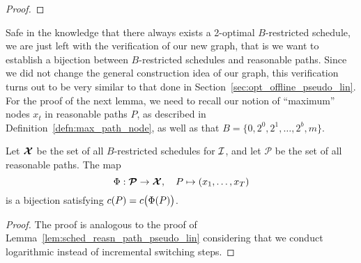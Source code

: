 \begin{proof}
\end{proof}
Safe in the knowledge that there always exists a 2-optimal $B$-restricted schedule, we are just left with the verification of our new graph, that is we want to establish a bijection between $B$-restricted schedules and reasonable paths. Since we did not change the general construction idea of our graph, this verification turns out to be very similar to that done in Section~\ref{sec:opt_offline_pseudo_lin}. For the proof of the next lemma, we need to recall our notion of ``maximum'' nodes $x_t$ in reasonable paths $P$, as described in Definition~\ref{defn:max_path_node}, as well as that $B=\{0,2^0,2^1,\dotsc,2^b,m\}$. 
\begin{lem}\label{lem:sched_reasn_path_approx_2}
Let $\bm{\mathcal{X}}$ be the set of all $B$-restricted schedules for $\mathcal{I}$, and let $\bm{\mathcal{P}}$ be the set of all reasonable paths. The map
\begin{equation*}
	\Phi:\bm{\mathcal{P}}\rightarrow\bm{\mathcal{X}},\quad P\mapsto (x_1,\dotsc,x_T)
\end{equation*}
is a bijection satisfying $c(P)=c\bigl(\Phi(P)\bigr)$.
\end{lem}
\begin{proof}
The proof is analogous to the proof of Lemma~\ref{lem:sched_reasn_path_pseudo_lin} considering that we conduct logarithmic instead of incremental switching steps.
\end{proof}
